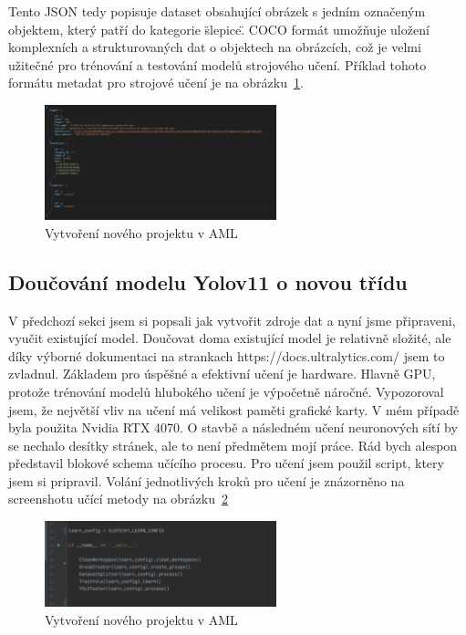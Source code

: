 Tento JSON tedy popisuje dataset obsahující obrázek s jedním označeným objektem, který patří do kategorie \"slepice\".
COCO formát umožňuje uložení komplexních a strukturovaných dat o objektech na obrázcích, což je velmi užitečné pro trénování a testování modelů strojového učení.
Příklad tohoto formátu metadat pro strojové učení je na obrázku~\ref{fig:coco_format}.

\begin{figure}[htbp]
    \centering
    \includegraphics[width=0.6\textwidth]{img/coco_format}
    \caption{Vytvoření nového projektu v AML}
    \label{fig:coco_format}
\end{figure}

\subsection{Doučování modelu Yolov11 o novou třídu}\label{subsec:doucovani-modelu-yolov11-o-novou-tridu}
V předchozí sekci jsem si popsali jak vytvořit zdroje dat a nyní jsme připraveni, vyučit existující model.
Doučovat doma existující model je relativně složité, ale díky výborné dokumentaci na strankach https://docs.ultralytics.com/ jsem to zvladnul.
Základem pro úspěšné a efektivní učení je hardware.
Hlavně GPU, protože trénování modelů hlubokého učení je výpočetně náročné.
Vypozoroval jsem, že největší vliv na učení má velikost paměti grafické karty.
V mém případě byla použita Nvidia RTX 4070.
O stavbě a následném učení neuronových sítí by se nechalo desítky stránek, ale to není předmětem mojí práce.
Rád bych alespon představil blokové schema učícího procesu.\newline
\newline
Pro učení jsem použil script, ktery jsem si pripravil.
Volání jednotlivých kroků pro učení je znázorněno na screenshotu učící metody na obrázku~\ref{fig:learn_script}

\begin{figure}[htbp]
    \centering
    \includegraphics[width=0.6\textwidth]{img/learn_script}
    \caption{Vytvoření nového projektu v AML}
    \label{fig:learn_script}
\end{figure}

